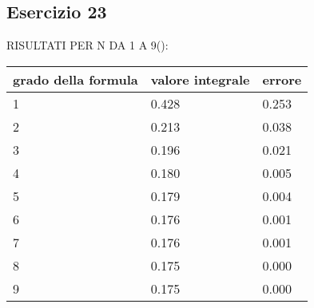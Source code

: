 \newpage
\subsection{Esercizio 23}


RISULTATI PER N DA 1 A 9():

\begin{table}[h]
    \begin{tabular}{|l l l|}
        \hline
        grado della formula & valore integrale & errore\\
        \hline
        1 & 0.428 & 0.253\\
        2 & 0.213 & 0.038\\
        3 & 0.196 & 0.021\\
        4 & 0.180 & 0.005\\
        5 & 0.179 & 0.004\\
        6 & 0.176 & 0.001\\
        7 & 0.176 & 0.001\\
        8 & 0.175 & 0.000\\
        9 & 0.175 & 0.000\\
        \hline
    \end{tabular}
\end{table}
   
